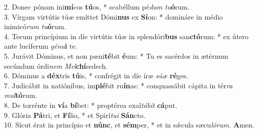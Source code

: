 2. Donec pónam ini\textbf{mí}cos \textbf{tú}os, * scabéllum pé\textit{dum tu}\textbf{ó}rum.\\
3. Vírgam virtútis túæ emíttet Dómi\textbf{nus} ex \textbf{Sí}on: * domináre in médio inimicó\textit{rum tu}\textbf{ó}rum.\\
4. Tecum princípium in díe virtútis túæ in splendóri\textbf{bus} san\textbf{ctó}rum: * ex útero ante lucíferum \textit{génu}\textbf{i} te.\\
5. Jurávit Dóminus, et non pæni\textbf{té}bit \textbf{é}um: * Tu es sacérdos in ætérnum secúndum órdi\textit{nem Mel}\textbf{chí}sedech.\\
6. Dóminus a \textbf{déx}tris \textbf{tú}is, * confrégit in díe íræ \textit{súæ} \textbf{ré}ges.\\
7. Judicábit in natiónibus, im\textbf{plé}bit ru\textbf{ín}as: * conquassábit cápita in tér\textit{ra mul}\textbf{tó}rum.\\
8. De torrénte in \textbf{ví}a \textbf{bí}bet: * proptérea exal\textit{tábit} \textbf{cá}put.\\
9. Glória\textbf{ Pá}tri, et \textbf{Fí}lio, * et Spirí\textit{tui} \textbf{Sán}cto.\\
10. Sícut érat in princípio et \textbf{núnc}, et \textbf{sém}per, * et in sǽcula sæcu\textit{lórum.} \textbf{A}men.